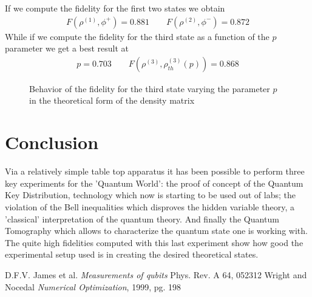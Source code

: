 \documentclass[a4paper, 11pt]{article}
\begin{document}
        If we compute the fidelity for the first two states we obtain
        \begin{gather*}
          F(\rho^{(1)},\phi^+) = 0.881 \qquad   F(\rho^{(2)},\phi^-) = 0.872
        \end{gather*}
        While if we compute the fidelity for the third state as a function of the $p$ parameter we get a best result at
        \begin{gather*}
          p = 0.703 \qquad F(\rho^{(3)},\rho^{(3)}_{th}(p)) = 0.868
        \end{gather*}

        \begin{figure}[H]
          \centering
          \caption{Behavior of the fidelity for the third state varying the parameter $p$ in the theoretical form of the density matrix}
          \label{fig:decoherence_fidelity}
        \end{figure}



  \section{Conclusion}
    Via a relatively simple table top apparatus it has been possible to perform three key experiments for the 'Quantum World': the proof of concept of the Quantum Key Distribution, technology which now is starting to be used out of labs; the violation of the Bell inequalities which disproves the hidden variable theory, a 'classical' interpretation of the quantum theory. And finally the Quantum Tomography which allows to characterize the quantum state one is working with. The quite high fidelities computed with this last experiment show how good the experimental setup used is in creating the desired theoretical states.



  \begin{thebibliography}{100}
     D.F.V. James et al. \emph{Measurements of qubits} Phys. Rev. A 64, 052312
     Wright and Nocedal \emph{Numerical Optimization}, 1999, pg. 198
  \end{thebibliography}
\end{document}
